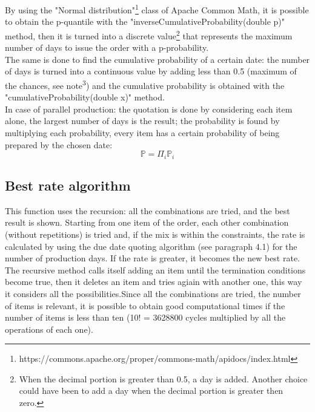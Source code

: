 \documentclass[a4paper,12pt]{article}
\begin{document}
By using the "Normal distribution"\footnote{https://commons.apache.org/proper/commons-math/apidocs/index.html} class of Apache Common Math, it is possible to obtain the p-quantile with the "inverseCumulativeProbability(double p)" method, then it is turned into a discrete value\footnote{When the decimal portion is greater than 0.5, a day is added. Another choice could have been to add a day when the decimal portion is greater then zero.} that represents the maximum number of days to issue the order with a p-probability. \\
The same is done to find the cumulative probability of a certain date: the number of days is turned into a continuous value by adding less than 0.5 (maximum of the chances, see note\textsuperscript{3}) and the cumulative probability is obtained with the "cumulativeProbability(double x)" method. \\
In case of parallel production: the quotation is done by considering each item alone, the largest number of days is the result; the probability is found by multiplying each probability, every item has a certain probability of being prepared by the chosen date:
\begin{equation*}
\mathbb{P} = \Pi_{i} \mathbb{P}_{i}
\end{equation*}

\subsection{Best rate algorithm}
This function uses the recursion: all the combinations are tried, and the best result is shown. Starting from one item of the order, each other combination (without repetitions) is tried and, if the mix is within the constraints, the rate is calculated by using the due date quoting algorithm (see paragraph 4.1) for the number of production days. If the rate is greater, it becomes the new best rate. The recursive method calls itself adding an item until the termination conditions become true, then it deletes an item and tries agiain with another one, this way it considers all the possibilities.Since all the combinations are tried, the number of items is relevant, it is possible to obtain good computational times if the number of items is less than ten (10! =  3628800 cycles multiplied by all the operations of each one). \\
\end{document}

